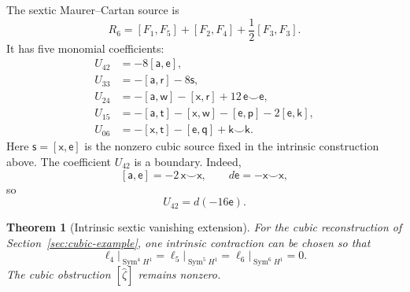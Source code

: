 \documentclass[11pt]{amsart}
\newtheorem{theorem}{Theorem}[section]
\begin{document}
The sextic Maurer--Cartan source is
\[
R_6=[F_1,F_5]+[F_2,F_4]+\frac12[F_3,F_3].
\]
It has five monomial coefficients:
\begin{align}
U_{42}&=-8[\mathsf a,\mathsf e],\label{eq:arity6-U42}\\
U_{33}&=-[\mathsf a,\mathsf r]-8\mathsf s,\label{eq:arity6-U33}\\
U_{24}&=-[\mathsf a,\mathsf w]-[\mathsf x,\mathsf r]+12\,\mathsf e\smile\mathsf e,\label{eq:arity6-U24}\\
U_{15}&=-[\mathsf a,\mathsf t]-[\mathsf x,\mathsf w]-[\mathsf e,\mathsf p]-2[\mathsf e,\mathsf k],\label{eq:arity6-U15}\\
U_{06}&=-[\mathsf x,\mathsf t]-[\mathsf e,\mathsf q]+\mathsf k\smile\mathsf k.\label{eq:arity6-U06}
\end{align}
Here $\mathsf s=[\mathsf x,\mathsf e]$ is the nonzero cubic source fixed in the intrinsic construction above.  The coefficient $U_{42}$ is a boundary.  Indeed,
\[
[\mathsf a,\mathsf e]=-2\,\mathsf x\smile\mathsf x,
\qquad
d\mathsf e=-\mathsf x\smile\mathsf x,
\]
so
\begin{equation}\label{eq:arity6-U42-boundary}
U_{42}=d(-16\mathsf e).
\end{equation}

\begin{theorem}[Intrinsic sextic vanishing extension]\label{thm:intrinsic-ell6-vanish}
For the cubic reconstruction of Section~\ref{sec:cubic-example}, one intrinsic contraction can be chosen so that
\[
\boxed{
\ell_4\big|_{\operatorname{Sym}^4H^1}
=
\ell_5\big|_{\operatorname{Sym}^5H^1}
=
\ell_6\big|_{\operatorname{Sym}^6H^1}
=0.
}
\]
The cubic obstruction $[\widehat\zeta]$ remains nonzero.
\end{theorem}
\end{document}
